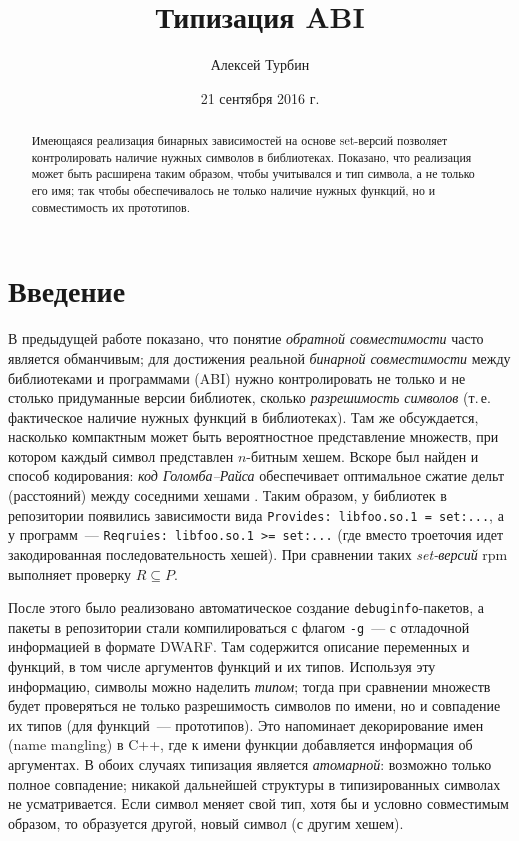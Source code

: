 \documentclass[russian,a4paper,12pt]{article}
\begin{document}
\title{Типизация ABI}
\author{Алексей Турбин}
\date{21 сентября 2016 г.}
\maketitle

\begin{abstract}
Имеющаяся реализация бинарных зависимостей на основе set-версий
позволяет контролировать наличие нужных символов в библиотеках.
Показано, что реализация может быть расширена таким образом,
чтобы учитывался и тип символа, а не только его имя; так чтобы
обеспечивалось не только наличие нужных функций, но и совместимость
их прототипов.
\end{abstract}

\section{Введение}
В предыдущей %
работе \cite{Tourbin2010} показано, что понятие \textit{обратной совместимости}
часто является обманчивым; для достижения реальной \textit{бинарной
совместимости} между библиотеками и программами (ABI) нужно контролировать
не только и не столько придуманные версии библиотек, сколько \textit{разрешимость символов}
(т.\,е. фактическое наличие нужных функций в библиотеках).  Там же обсуждается, насколько
компактным может быть вероятностное представление множеств, при котором каждый
символ представлен $n$-битным хешем.  Вскоре был найден и способ кодирования:
\textit{код Голомба--Райса} обеспечивает оптимальное сжатие дельт (расстояний)
между соседними хешами \cite{Putze2007}.  Таким образом, у библиотек в репозитории появились
зависимости вида \texttt{Provides: libfoo.so.1~= set:...}, а у программ~---
\texttt{Reqruies: libfoo.so.1~>=~set:...} (где вместо троеточия идет закодированная
последовательность хешей).  При сравнении таких \textit{set-версий} rpm выполняет проверку
$R\subseteq P$.

После этого было реализовано автоматическое создание \verb|debuginfo|-пакетов,
а пакеты в репозитории стали компилироваться с флагом \verb|-g|~--- с отладочной информацией
в формате DWARF.  Там содержится описание переменных и функций, в том числе аргументов
функций и их типов.  Используя эту информацию, символы можно наделить \textit{типом};
тогда при сравнении множеств будет проверяться не только разрешимость символов по имени,
но и совпадение их типов (для функций~--- прототипов).  Это напоминает
декорирование имен (name mangling) в C++, где к имени функции добавляется информация
об аргументах.  В обоих случаях типизация является \textit{атомарной}: возможно только
полное совпадение; никакой дальнейшей структуры в типизированных символах не усматривается.
Если символ меняет свой тип, хотя бы и условно совместимым образом, то образуется другой,
новый символ (с другим хешем).
\end{document}
